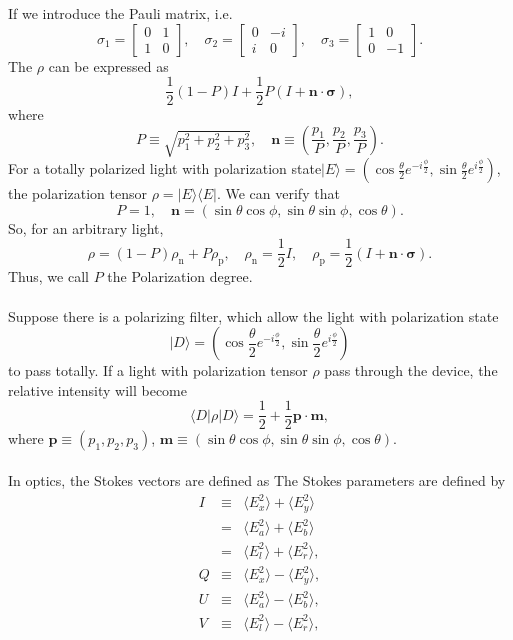 If we introduce the Pauli matrix, i.e.
\[\sigma_1 = \left[ \begin{matrix} 0& 1\\ 1& 0\end{matrix} \right] , \quad \sigma_2 = \left[ \begin{matrix} 0& - i\\ i& 0\end{matrix} \right] , \quad \sigma_3 = \left[ \begin{matrix} 1& 0\\ 0& -1\end{matrix} \right] .\]
The $\rho$ can be expressed as
\[\frac{1}{2} (1-P) I + \frac{1}{2} P(I + \bm{n} \cdot \bm{\sigma}),\]
where
\[P \equiv \sqrt{p_1^2 + p_2^2 + p_3^2} , \quad \bm{n} \equiv (\frac{p_1}{P},\frac{p_2}{P},\frac{p_3}{P}).\]
For a totally polarized light with polarization state$ | E\rangle = (\cos \frac{\theta}{2} e^{-i\frac{\phi}{2}} , \sin \frac{\theta}{2} e^{i\frac{\phi}{2}})$, the polarization tensor $\rho = |E\rangle \langle E|$. We can verify that
\[P = 1 , \quad \bm{n} = (\sin\theta \cos\phi, \sin\theta \sin\phi, \cos \theta).\]
So, for an arbitrary light,
\[\rho = (1-P)\rho_{\mathrm{n}} + P \rho_{\mathrm{p}} , \quad \rho_{\mathrm{n}} = \frac{1}{2}I , \quad \rho_{\mathrm{p}} = \frac{1}{2}(I + \bm{n} \cdot \bm{\sigma}).\]
Thus, we call $P$ the Polarization degree. \\ \\
Suppose there is a polarizing filter,  which allow the light with polarization state
\[| D \rangle = (\cos \frac{\theta}{2} e^{-i\frac{\phi}{2}} , \sin \frac{\theta}{2} e^{i\frac{\phi}{2}})\]
to pass totally. If a light with polarization tensor $\rho$ pass through the device, the relative intensity will become
\[\langle D | \rho | D \rangle = \frac{1}{2} + \frac{1}{2} \bm{p} \cdot \bm{m},\]
where $\bm{p} \equiv (p_1,p_2,p_3)$, $\bm{m} \equiv (\sin\theta \cos\phi, \sin\theta \sin\phi, \cos \theta)$.
\\ \\
In optics, the Stokes vectors are defined as
The Stokes parameters are defined by
\begin{eqnarray}
I&\equiv& \langle E_{x}^{2}\rangle +\langle E_{y}^{2}\rangle \nonumber \\
&=& \langle E_{a}^{2}\rangle +\langle E_{b}^{2}\rangle \nonumber \\
&=& \langle E_{l}^{2}\rangle +\langle E_{r}^{2}\rangle, \nonumber \\
Q&\equiv& \langle E_{x}^{2}\rangle -\langle E_{y}^{2}\rangle, \nonumber \\
U&\equiv& \langle E_{a}^{2}\rangle -\langle E_{b}^{2}\rangle, \nonumber \\
V&\equiv& \langle E_{l}^{2}\rangle -\langle E_{r}^{2}\rangle, \nonumber
\end{eqnarray}
